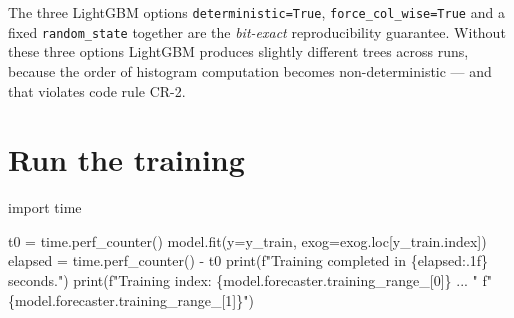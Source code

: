 \documentclass[
  english,
  letterpaper,
]{scrbook}
\newenvironment{Shaded}{\begin{snugshade}}{\end{snugshade}}
\newcommand{\BuiltInTok}[1]{\textcolor[rgb]{0.00,0.23,0.31}{#1}}
\newcommand{\DecValTok}[1]{\textcolor[rgb]{0.68,0.00,0.00}{#1}}
\newcommand{\ImportTok}[1]{\textcolor[rgb]{0.00,0.46,0.62}{#1}}
\newcommand{\NormalTok}[1]{\textcolor[rgb]{0.00,0.23,0.31}{#1}}
\newcommand{\OperatorTok}[1]{\textcolor[rgb]{0.37,0.37,0.37}{#1}}
\newcommand{\SpecialCharTok}[1]{\textcolor[rgb]{0.37,0.37,0.37}{#1}}
\newcommand{\SpecialStringTok}[1]{\textcolor[rgb]{0.13,0.47,0.30}{#1}}
\begin{document}
\begin{tcolorbox}[enhanced jigsaw, arc=.35mm, bottomrule=.15mm, bottomtitle=1mm, breakable, colback=white, colbacktitle=quarto-callout-note-color!10!white, colframe=quarto-callout-note-color-frame, coltitle=black, left=2mm, leftrule=.75mm, opacityback=0, opacitybacktitle=0.6, rightrule=.15mm, title=\textcolor{quarto-callout-note-color}{\faInfo}\hspace{0.5em}{CR-2 in practice}, titlerule=0mm, toprule=.15mm, toptitle=1mm]

The three LightGBM options \texttt{deterministic=True},
\texttt{force\_col\_wise=True} and a fixed \texttt{random\_state}
together are the \emph{bit-exact} reproducibility guarantee. Without
these three options LightGBM produces slightly different trees across
runs, because the order of histogram computation becomes
non-deterministic --- and that violates code rule CR-2.

\end{tcolorbox}

\section{Run the training}\label{run-the-training}

\protect{}\label{fit-model}
\begin{Shaded}
\begin{Highlighting}[]
\ImportTok{import}\NormalTok{ time}

\NormalTok{t0 }\OperatorTok{=}\NormalTok{ time.perf\_counter()}
\NormalTok{model.fit(y}\OperatorTok{=}\NormalTok{y\_train, exog}\OperatorTok{=}\NormalTok{exog.loc[y\_train.index])}
\NormalTok{elapsed }\OperatorTok{=}\NormalTok{ time.perf\_counter() }\OperatorTok{{-}}\NormalTok{ t0}
\BuiltInTok{print}\NormalTok{(}\SpecialStringTok{f"Training completed in }\SpecialCharTok{\{}\NormalTok{elapsed}\SpecialCharTok{:.1f\}}\SpecialStringTok{ seconds."}\NormalTok{)}
\BuiltInTok{print}\NormalTok{(}\SpecialStringTok{f"Training index:  }\SpecialCharTok{\{}\NormalTok{model}\SpecialCharTok{.}\NormalTok{forecaster}\SpecialCharTok{.}\NormalTok{training\_range\_[}\DecValTok{0}\NormalTok{]}\SpecialCharTok{\}}\SpecialStringTok{  ...  "}
      \SpecialStringTok{f"}\SpecialCharTok{\{}\NormalTok{model}\SpecialCharTok{.}\NormalTok{forecaster}\SpecialCharTok{.}\NormalTok{training\_range\_[}\DecValTok{1}\NormalTok{]}\SpecialCharTok{\}}\SpecialStringTok{"}\NormalTok{)}
\end{Highlighting}
\end{Shaded}
\end{document}
